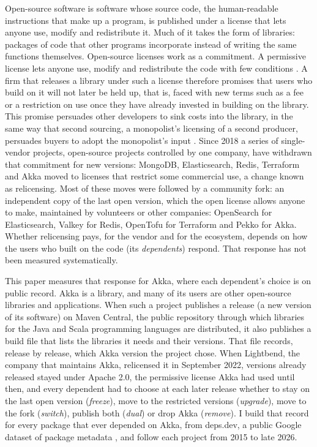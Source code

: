 \documentclass[11pt]{article}
\begin{document}
Open-source software is software whose source code, the human-readable instructions that make up a program, is published under a license that lets anyone use, modify and redistribute it. Much of it takes the form of libraries: packages of code that other programs incorporate instead of writing the same functions themselves. Open-source licenses work as a commitment. A permissive license lets anyone use, modify and redistribute the code with few conditions \citep{lerner2002,lerner2005}. A firm that releases a library under such a license therefore promises that users who build on it will not later be held up, that is, faced with new terms such as a fee or a restriction on use once they have already invested in building on the library. This promise persuades other developers to sink costs into the library, in the same way that second sourcing, a monopolist's licensing of a second producer, persuades buyers to adopt the monopolist's input \citep{farrell1988}. Since 2018 a series of single-vendor projects, open-source projects controlled by one company, have withdrawn that commitment for new versions: MongoDB, Elasticsearch, Redis, Terraform and Akka moved to licenses that restrict some commercial use, a change known as relicensing. Most of these moves were followed by a community fork: an independent copy of the last open version, which the open license allows anyone to make, maintained by volunteers or other companies: OpenSearch for Elasticsearch, Valkey for Redis, OpenTofu for Terraform and Pekko for Akka. Whether relicensing pays, for the vendor and for the ecosystem, depends on how the users who built on the code (its \emph{dependents}) respond. That response has not been measured systematically.

This paper measures that response for Akka, where each dependent's choice is on public record. Akka is a library, and many of its users are other open-source libraries and applications. When such a project publishes a release (a new version of its software) on Maven Central, the public repository through which libraries for the Java and Scala programming languages are distributed, it also publishes a build file that lists the libraries it needs and their versions. That file records, release by release, which Akka version the project chose. When Lightbend, the company that maintains Akka, relicensed it in September 2022, versions already released stayed under Apache 2.0, the permissive license Akka had used until then, and every dependent had to choose at each later release whether to stay on the last open version (\emph{freeze}), move to the restricted versions (\emph{upgrade}), move to the fork (\emph{switch}), publish both (\emph{dual}) or drop Akka (\emph{remove}). I build that record for every package that ever depended on Akka, from deps.dev, a public Google dataset of package metadata \citep{depsdev}, and follow each project from 2015 to late 2026.
\end{document}
